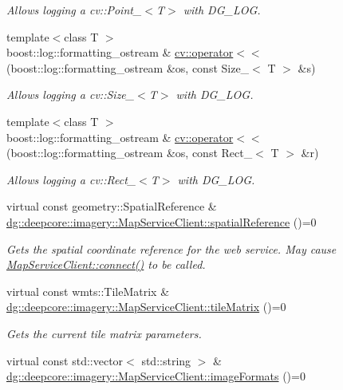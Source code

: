 \begin{DoxyCompactItemize}
\begin{DoxyCompactList}\small\item\em Allows logging a cv\+::\+Point\+\_\+$<$\+T$>$ with D\+G\+\_\+\+L\+OG. \end{DoxyCompactList}\item 
{\footnotesize template$<$class T $>$ }\\boost\+::log\+::formatting\+\_\+ostream \& \hyperlink{group___imagery_module_ga0656a5315cde33b97aa201d95d1a285f}{cv\+::operator$<$$<$} (boost\+::log\+::formatting\+\_\+ostream \&os, const Size\+\_\+$<$ T $>$ \&s)
\begin{DoxyCompactList}\small\item\em Allows logging a cv\+::\+Size\+\_\+$<$\+T$>$ with D\+G\+\_\+\+L\+OG. \end{DoxyCompactList}\item 
{\footnotesize template$<$class T $>$ }\\boost\+::log\+::formatting\+\_\+ostream \& \hyperlink{group___imagery_module_gae1a3630bfbc5f81997647209bc6fcc38}{cv\+::operator$<$$<$} (boost\+::log\+::formatting\+\_\+ostream \&os, const Rect\+\_\+$<$ T $>$ \&r)
\begin{DoxyCompactList}\small\item\em Allows logging a cv\+::\+Rect\+\_\+$<$\+T$>$ with D\+G\+\_\+\+L\+OG. \end{DoxyCompactList}\item 
virtual const geometry\+::\+Spatial\+Reference \& \hyperlink{group___imagery_module_ga12013189aa3bae04ed159d917d41ab63}{dg\+::deepcore\+::imagery\+::\+Map\+Service\+Client\+::spatial\+Reference} ()=0
\begin{DoxyCompactList}\small\item\em Gets the spatial coordinate reference for the web service. May cause \hyperlink{group___imagery_module_ga5e5f58c725cafba7966936f688a6ade0}{Map\+Service\+Client\+::connect()} to be called. \end{DoxyCompactList}\item 
virtual const wmts\+::\+Tile\+Matrix \& \hyperlink{group___imagery_module_ga0f308a2d98dc9f34b8ca651576265449}{dg\+::deepcore\+::imagery\+::\+Map\+Service\+Client\+::tile\+Matrix} ()=0
\begin{DoxyCompactList}\small\item\em Gets the current tile matrix parameters. \end{DoxyCompactList}\item 
virtual const std\+::vector$<$ std\+::string $>$ \& \hyperlink{group___imagery_module_ga48b6f633e02c44d955b4d4b1b8352b57}{dg\+::deepcore\+::imagery\+::\+Map\+Service\+Client\+::image\+Formats} ()=0

\end{DoxyCompactItemize}
